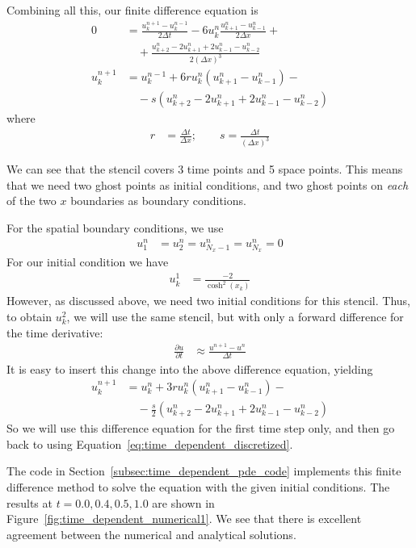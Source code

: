 \documentclass[twocolumn]{myarticle}
\numberwithin{equation}{section}
\begin{document}
Combining all this, our finite difference equation is
\begin{align}
    0 &= \frac{u^{n+1}_{k} - u^{n-1}_{k}}{2 \Delta t} - 6 u^n_k \frac{u^n_{k+1} - u^n_{k-1}}{2 \Delta x} + \nonumber
    \\
    & \quad + \frac{u^n_{k+2} - 2 u^n_{k+1} + 2u^n_{k-1} - u^n_{k-2}}{2 (\Delta x)^3}
    \\
    u^{n+1}_k &= u^{n-1}_{k} + 6 r u^n_k \left( u^n_{k+1} - u^n_{k-1}\right) - \nonumber
    \\
    & \quad - s \left( u^n_{k+2} - 2 u^n_{k+1} + 2u^n_{k-1} - u^n_{k-2} \right) \label{eq:time_dependent_discretized}
\end{align}
where
\begin{align}
    r &= \frac{\Delta t}{\Delta x}; \qquad s = \frac{\Delta t}{(\Delta x)^3}
\end{align}

We can see that the stencil covers 3 time points and 5 space points.
This means that we need two ghost points as initial conditions, and two ghost points on \emph{each} of the two $ x $ boundaries as boundary conditions.

For the spatial boundary conditions, we use
\begin{align}
    u^n_1 &= u^n_2 = u^n_{N_x-1} = u^n_{N_x} = 0
\end{align}
For our initial condition we have
\begin{align}
    u^1_k &= \frac{-2}{\cosh^2 \left( x_k \right)}
\end{align}
However, as discussed above, we need two initial conditions for this stencil.
Thus, to obtain $ u^2_k $, we will use the same stencil, but with only a forward difference for the time derivative:
\begin{align}
    \frac{\partial u}{\partial t} &\approx \frac{u^{n+1} - u^n}{\Delta t}
\end{align}
It is easy to insert this change into the above difference equation, yielding
\begin{align}
    u^{n+1}_k &= u^{n}_{k} + 3 r u^n_k \left( u^n_{k+1} - u^n_{k-1}\right) - \nonumber
    \\
    & \quad - \frac{s}{2} \left( u^n_{k+2} - 2 u^n_{k+1} + 2u^n_{k-1} - u^n_{k-2} \right)
\end{align}
So we will use this difference equation for the first time step only, and then go back to using Equation~\ref{eq:time_dependent_discretized}.

The code in Section~\ref{subsec:time_dependent_pde_code} implements this finite difference method to solve the equation with the given initial conditions.
The results at $ t = 0.0, 0.4, 0.5, 1.0 $ are shown in Figure~\ref{fig:time_dependent_numerical1}.
We see that there is excellent agreement between the numerical and analytical solutions.
\end{document}
